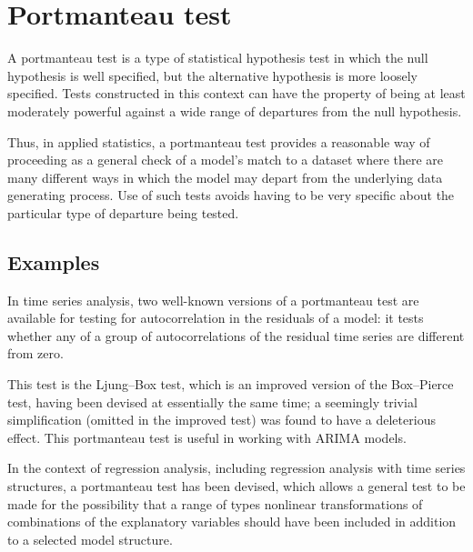 \section{Portmanteau test}

A portmanteau test is a type of statistical hypothesis test in which the null hypothesis is well specified, but the alternative hypothesis is more loosely specified. Tests constructed in this context can have the property of being at least moderately powerful against a wide range of departures from the null hypothesis. 

Thus, in applied statistics, a portmanteau test provides a reasonable way of proceeding as a general check of a model's match to a dataset where there are many different ways in which the model may depart from the underlying data generating process. Use of such tests avoids having to be very specific about the particular type of departure being tested.

\subsection{Examples}
In time series analysis, two well-known versions of a portmanteau test are available for testing for autocorrelation in the residuals of a model: it tests whether any of a group of autocorrelations of the residual time series are different from zero. 

This test is the Ljung–Box test, which is an improved version of the Box–Pierce test, having been devised at essentially the same time; a seemingly trivial simplification (omitted in the improved test) was found to have a deleterious effect.
This portmanteau test is useful in working with ARIMA models.

In the context of regression analysis, including regression analysis with time series structures, a portmanteau test has been devised, which allows a general test to be made for the possibility that a range of types nonlinear transformations of combinations of the explanatory variables should have been included in addition to a selected model structure.


